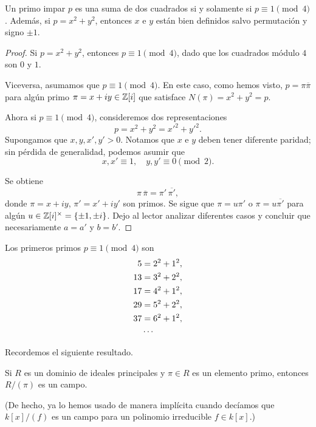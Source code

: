 \begin{proposicion}[Fermat]
  Un primo impar $p$ es una suma de dos cuadrados si y solamente si
  $p \equiv 1 \pmod{4}$. Además, si $p = x^2 + y^2$, entonces $x$ e $y$ están
  bien definidos salvo permutación y signo $\pm 1$.

  \begin{proof}
    Si $p = x^2 + y^2$, entonces $p \equiv 1 \pmod{4}$, dado que los cuadrados
    módulo $4$ son $0$ y $1$.

    Viceversa, asumamos que $p \equiv 1 \pmod{4}$. En este caso, como hemos
    visto, $p = \pi \overline{\pi}$ para algún primo $\pi = x + iy \in \mathbb{Z} [i]$
    que satisface $N (\pi) = x^2 + y^2 = p$.

    Ahora si $p \equiv 1 \pmod{4}$, consideremos dos representaciones
    $$p = x^2 + y^2 = x'^2 + y'^2.$$
    Supongamos que $x,y,x',y' > 0$. Notamos que $x$ e $y$ deben tener diferente
    paridad; sin pérdida de generalidad, podemos asumir que
    $$x,x' \equiv 1, \quad y,y' \equiv 0 \pmod{2}.$$

    Se obtiene
    $$\pi\,\overline{\pi} = \pi'\,\overline{\pi'},$$
    donde $\pi = x + iy$, $\pi' = x' + iy'$ son primos. Se sigue que
    $\pi = u\pi'$ o $\pi = u\overline{\pi'}$ para algún
    $u \in \mathbb{Z} [i]^\times = \{ \pm 1, \pm i \}$. Dejo al lector analizar
    diferentes casos y concluir que necesariamente $a = a'$ y $b = b'$.
  \end{proof}
\end{proposicion}

\begin{ejemplo}
  Los primeros primos $p \equiv 1 \pmod{4}$ son
  \begin{align*}
    5 & = 2^2 + 1^2,\\
    13 & = 3^2 + 2^2,\\
    17 & = 4^2 + 1^2,\\
    29 & = 5^2 + 2^2,\\
    37 & = 6^2 + 1^2,\\
    & \cdots \qedhere
  \end{align*}
\end{ejemplo}


Recordemos el siguiente resultado.

\begin{proposicion}
  Si $R$ es un dominio de ideales principales y $\pi \in R$ es un elemento
  primo, entonces $R/(\pi)$ es un campo.
\end{proposicion}
(De hecho, ya lo hemos usado de manera implícita cuando decíamos que $k[x]/(f)$
es un campo para un polinomio irreducible $f \in k[x]$.)

